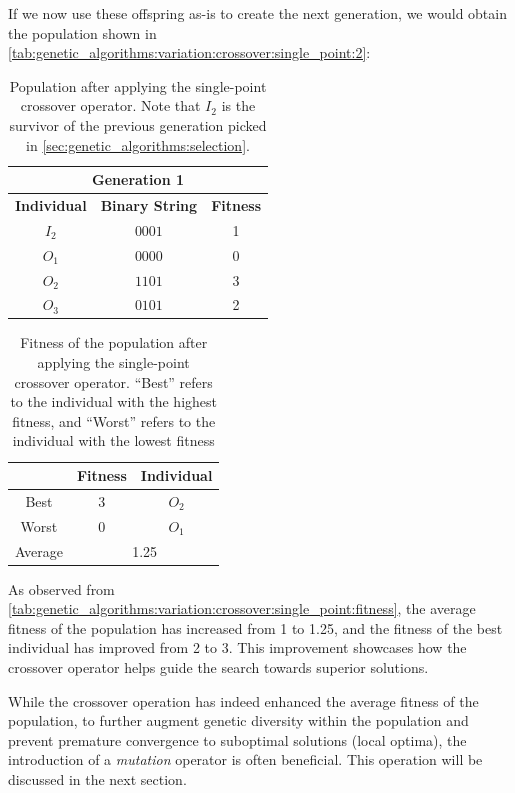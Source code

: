   If we now use these offspring as-is to create the next generation, we would obtain the
  population shown in \vref{tab:genetic_algorithms:variation:crossover:single_point:2}:

  \begin{table}[ht!]
    \centering
    \begin{tabular}{c | c | c }
      \multicolumn{3}{c}{\textbf{Generation 1}} \\
      \hline
      \hline
      \textbf{Individual} & \textbf{Binary String}  & \textbf{Fitness} \\
      \hline
      \(I_2\)             & \(0001\)                & 1 \\
      \(O_1\)             & \(0000\)                & 0 \\
      \(O_2\)             & \(1101\)                & 3 \\
      \(O_3\)             & \(0101\)                & 2
    \end{tabular}
    \caption{
      Population after applying the single-point crossover operator.
      Note that \(I_2\) is the survivor of the previous generation picked in 
      \vref{sec:genetic_algorithms:selection}.
    }
    \label{tab:genetic_algorithms:variation:crossover:single_point:2}
  \end{table}

  \begin{table}[H]
    \centering
    \begin{tabular}{|c|c|c|}
      \hline
            & \textbf{Fitness} & \textbf{Individual}  \\
      \hline
      Best  & 3 & \(O_2\) \\
      Worst & 0 & \(O_1\) \\
      \hline
      \hline
      Average & \multicolumn{2}{c|}{1.25} \\
      \hline
    \end{tabular}
    \caption{
      Fitness of the population after applying the single-point crossover operator.
      \enquote{Best} refers to the individual with the highest fitness, and \enquote{Worst} refers 
      to the individual with the lowest fitness
    }
    \label{tab:genetic_algorithms:variation:crossover:single_point:fitness}
  \end{table}

  As observed from \vref{tab:genetic_algorithms:variation:crossover:single_point:fitness}, the 
  average fitness of the population has increased from 1 to 1.25, and the fitness of the best 
  individual has improved from 2 to 3. 
  This improvement showcases how the crossover operator helps guide the search towards superior 
  solutions.

  While the crossover operation has indeed enhanced the average fitness of the population, to 
  further augment genetic diversity within the population and prevent premature convergence to 
  suboptimal solutions (local optima), the introduction of a \emph{mutation} operator is often 
  beneficial. 
  This operation will be discussed in the next section.
